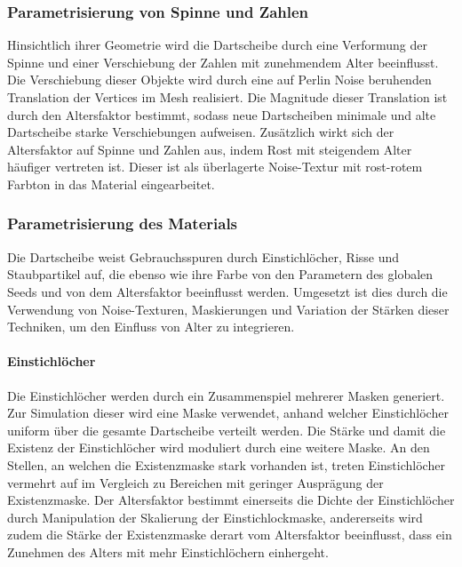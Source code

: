 \subsubsection{Parametrisierung von Spinne und Zahlen}

Hinsichtlich ihrer Geometrie wird die Dartscheibe durch eine Verformung der Spinne und einer Verschiebung der Zahlen mit zunehmendem Alter beeinflusst. Die Verschiebung dieser Objekte wird durch eine auf Perlin Noise beruhenden Translation der Vertices im Mesh realisiert. Die Magnitude dieser Translation ist durch den Altersfaktor bestimmt, sodass neue Dartscheiben minimale und alte Dartscheibe starke Verschiebungen aufweisen. Zusätzlich wirkt sich der Altersfaktor auf Spinne und Zahlen aus, indem Rost mit steigendem Alter häufiger vertreten ist. Dieser ist als überlagerte Noise-Textur mit rost-rotem Farbton in das Material eingearbeitet.

\subsubsection{Parametrisierung des Materials}

Die Dartscheibe weist Gebrauchsspuren durch Einstichlöcher, Risse und Staubpartikel auf, die ebenso wie ihre Farbe von den Parametern des globalen Seeds und von dem Altersfaktor beeinflusst werden. Umgesetzt ist dies durch die Verwendung von Noise-Texturen, Maskierungen und Variation der Stärken dieser Techniken, um den Einfluss von Alter zu integrieren.

\paragraph{Einstichlöcher}

Die Einstichlöcher werden durch ein Zusammenspiel mehrerer Masken generiert. Zur Simulation dieser wird eine Maske verwendet, anhand welcher Einstichlöcher uniform über die gesamte Dartscheibe verteilt werden. Die Stärke und damit die Existenz der Einstichlöcher wird moduliert durch eine weitere Maske. An den Stellen, an welchen die Existenzmaske stark vorhanden ist, treten Einstichlöcher vermehrt auf im Vergleich zu Bereichen mit geringer Ausprägung der Existenzmaske. Der Altersfaktor bestimmt einerseits die Dichte der Einstichlöcher durch Manipulation der Skalierung der Einstichlockmaske, andererseits wird zudem die Stärke der Existenzmaske derart vom Altersfaktor beeinflusst, dass ein Zunehmen des Alters mit mehr Einstichlöchern einhergeht.

